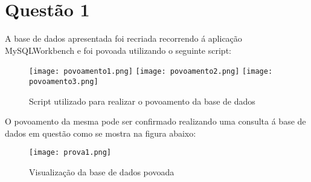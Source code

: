 \section{Questão 1}

A base de dados apresentada foi recriada recorrendo á aplicação MySQLWorkbench\cite{ref_intro} e foi povoada utilizando o seguinte script:

\begin{figure}[H]

  \centering
  \captionsetup{justification=centering}

  \texttt{[image: povoamento1.png]}
  \texttt{[image: povoamento2.png]}
  \texttt{[image: povoamento3.png]}
  
  \caption {Script utilizado para realizar o povoamento da base de dados}

  \label{fig:povoamento}
\end{figure}


O povoamento da mesma pode ser confirmado realizando uma consulta á base de dados em questão como se mostra na figura abaixo:

\begin{figure}[H]

  \centering
  \captionsetup{justification=centering}

  \texttt{[image: prova1.png]}
  
  \caption {Visualização da base de dados povoada}

  \label{fig:baseDeDados}
\end{figure}
